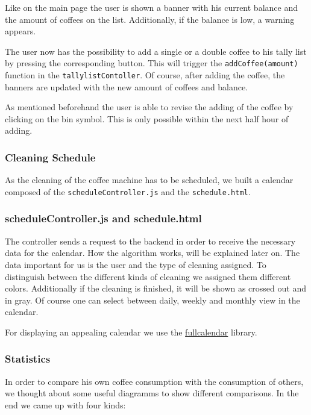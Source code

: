 Like on the main page the user is shown a banner with his current
balance and the amount of coffees on the list. Additionally, if the
balance is low, a warning appears.

The user now has the possibility to add a single or a double coffee to
his tally list by pressing the corresponding button. This will trigger
the \texttt{addCoffee(amount)} function in the
\texttt{tallylistContoller}. Of course, after adding the coffee, the
banners are updated with the new amount of coffees and balance.

As mentioned beforehand the user is able to revise the adding of the
coffee by clicking on the bin symbol. This is only possible within the
next half hour of adding.

\subsubsection{Cleaning Schedule}\label{cleaning-schedule}

As the cleaning of the coffee machine has to be scheduled, we built a
calendar composed of the \texttt{scheduleController.js} and the
\texttt{schedule.html}.

\subsubsection*{scheduleController.js and schedule.html}

The controller sends a request to the backend in order to receive the
necessary data for the calendar. How the algorithm works, will be
explained later on. The data important for us is the user and the type
of cleaning assigned. To distinguish between the different kinds of
cleaning we assigned them different colors. Additionally if the cleaning
is finished, it will be shown as crossed out and in gray. Of course one
can select between daily, weekly and monthly view in the calendar.

For displaying an appealing calendar we use the
\href{http://fullcalendar.io/}{fullcalendar} library.

\subsubsection{Statistics}\label{statistics}

In order to compare his own coffee consumption with the consumption of
others, we thought about some useful diagramms to show different
comparisons. In the end we came up with four kinds:

